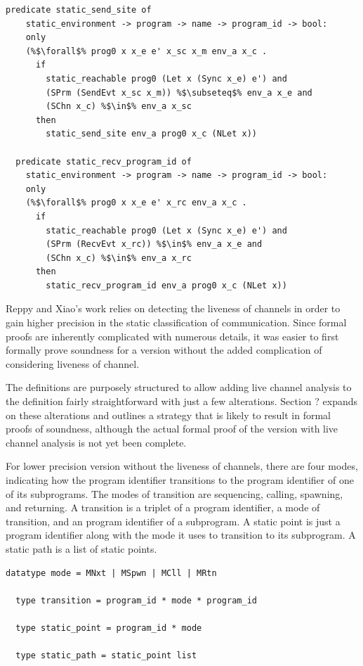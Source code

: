 \documentclass{article}
\begin{document}
\begin{lstlisting}[language=logic, escapechar=\%]
  predicate static_send_site of
    static_environment -> program -> name -> program_id -> bool:
    only
    (%$\forall$% prog0 x x_e e' x_sc x_m env_a x_c .
      if
        static_reachable prog0 (Let x (Sync x_e) e') and
        (SPrm (SendEvt x_sc x_m)) %$\subseteq$% env_a x_e and 
        (SChn x_c) %$\in$% env_a x_sc
      then
        static_send_site env_a prog0 x_c (NLet x))

  predicate static_recv_program_id of
    static_environment -> program -> name -> program_id -> bool:
    only
    (%$\forall$% prog0 x x_e e' x_rc env_a x_c .
      if
        static_reachable prog0 (Let x (Sync x_e) e') and
        (SPrm (RecvEvt x_rc)) %$\in$% env_a x_e and 
        (SChn x_c) %$\in$% env_a x_rc 
      then
        static_recv_program_id env_a prog0 x_c (NLet x))
  \end{lstlisting}

Reppy and Xiao's work relies on detecting the liveness of channels in order to gain higher
precision in the static classification of communication. Since formal proofs are inherently
complicated with numerous details, it was easier to first formally prove soundness for a
version without the added complication of considering liveness of channel.

The definitions are purposely structured to allow adding live channel analysis to the
definition fairly straightforward with just a few alterations.  Section ? expands on
these alterations and outlines a strategy that is likely to result in formal proofs of
soundness, although the actual formal proof of the version with live channel analysis is
not yet been complete.  

For lower precision version without the liveness of channels, there are four modes,
indicating how the program identifier transitions to the program identifier of one of
its subprograms.
The modes of transition are sequencing, calling, spawning, and returning. A transition is a
triplet of a program identifier, a mode of transition, and an program identifier of a
subprogram. A static point is just a program identifier along with the mode it uses to
transition to its subprogram. A static path is a list of static points.  

\begin{lstlisting}[language=logic, escapechar=\%]
  datatype mode = MNxt | MSpwn | MCll | MRtn

  type transition = program_id * mode * program_id

  type static_point = program_id * mode

  type static_path = static_point list
  \end{lstlisting}
\end{document}
